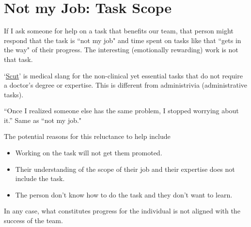 \section{Not my Job: Task Scope}


If I ask someone for help on a task that benefits our team, that person might respond that the task is ``not my job" and time spent on tasks like that ``gets in the way" of their progress. The interesting (emotionally rewarding) work is not that task.

`\href{https://www.urbandictionary.com/define.php?term=scut}{Scut}' is medical slang for the non-clinical yet essential tasks that do not require a doctor's degree or expertise.
This is different from administrivia (administrative tasks).

``Once I realized someone else has the same problem, I stopped worrying about it.'' Same as ``not my job."

The potential reasons for this reluctance to help include
\begin{itemize}
    \item Working on the task will not get them promoted.
    \item Their understanding of the scope of their job and their expertise does not include the task.
    \item The person don't know how to do the task and they don't want to learn.
\end{itemize}
In any case, what constitutes progress for the individual  is not aligned with the success of the team.